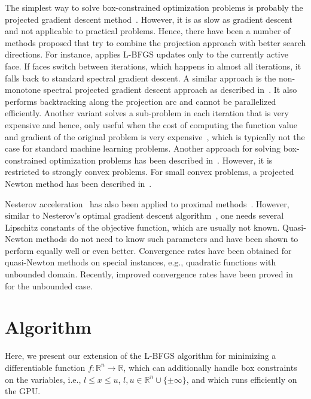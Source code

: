\documentclass[letterpaper]{article} %
\newcommand{\setR}{\mathbb{R}}
\newcommand{\ignore}[1]{}
\begin{document}
The simplest way to solve box-constrained optimization problems is probably the projected gradient descent method~\cite{Nesterov04}. However, it is as slow as gradient descent and not applicable to practical problems. Hence, there have been a number of methods proposed that try to combine the projection approach with better search directions. For instance, \cite{Berg20} applies L-BFGS updates only to the currently active face. If faces switch between iterations, which happens in almost all iterations, it falls back to standard spectral gradient descent. A similar approach is the non-monotone spectral projected gradient descent approach as described in~\cite{SchmidtKS11}. It also performs backtracking along the projection arc and cannot be parallelized efficiently. Another variant solves a sub-problem in each iteration that is very expensive and hence, only useful when the cost of computing the function value and gradient of the original problem is very expensive~\cite{SchmidtBFM09}, which is typically not the case for standard machine learning problems. Another approach for solving box-constrained optimization problems has been described in~\cite{KimSD10}. However, it is restricted to strongly convex problems. For small convex problems, a projected Newton method has been described in~\cite{Bertsekas82}.

Nesterov acceleration~\cite{Nesterov83} has also been applied to proximal methods~\cite{BeckT09, LiL15}. However, similar to Nesterov's optimal gradient descent algorithm~\cite{Nesterov83}, one needs several Lipschitz constants of the objective function, which are usually not known. Quasi-Newton methods do not need to know such parameters and have been shown to perform equally well or even better.
Convergence rates have been obtained for quasi-Newton methods on special instances, e.g., quadratic functions with unbounded domain. Recently, improved convergence rates have been proved in~\cite{RodomanovN21} for the unbounded case.

\section{Algorithm} \label{sec:algo}

\ignore{
Here, we present our extension of the L-BFGS algorithm that can additionally handle box constraints and %
runs efficiently on the GPU. In the algorithm and its analysis we are using the following notation.
}

Here, we present our extension of the L-BFGS algorithm for minimizing a differentiable function $f\colon\setR^n\to\setR$, which can additionally handle box constraints on the variables, i.e., $l\leq x\leq u$, $l, u\in\setR^n\cup \{\pm\infty\}$, and which runs efficiently on the GPU.
\end{document}
